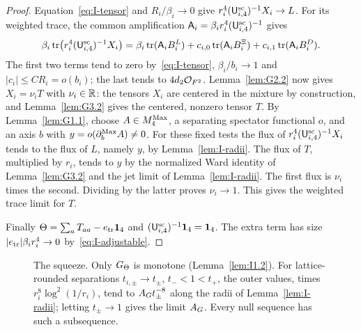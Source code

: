 \begin{proof}
Equation~\eqref{eq:I-tensor} and $R_i/\beta_i\to0$ give $r_i^4(\mathsf{U}_{i,4}^{\mathrm{sc}})^{-1}X_i\to L$. For its weighted trace, the common amplification $\mathsf A_i=\beta_ir_i^4(\mathsf{U}_{i,4}^{\mathrm{sc}})^{-1}$ gives
\begin{equation*}
\beta_i\operatorname{tr}\bigl(r_i^4(\mathsf{U}_{i,4}^{\mathrm{sc}})^{-1}X_i\bigr)
=\beta_i\operatorname{tr}(\mathsf A_iB_i^L)
+c_{i,0}\operatorname{tr}(\mathsf A_iB_i^\Xi)
+c_{i,1}\operatorname{tr}(\mathsf A_iB_i^D).
\end{equation*}
The first two terms tend to zero by~\eqref{eq:I-tensor}, $\beta_i/b_i\to1$ and $|c_i|\le CR_i=o(b_i)$; the last tends to $4d_2\mathcal{O}_{F^2}$. Lemma~\ref{lem:G2.2} now gives $X_i=\nu_iT$ with $\nu_i\in\mathbb{R}$: the tensors $X_i$ are centered in the mixture by construction, and Lemma~\ref{lem:G3.2} gives the centered, nonzero tensor $T$. By Lemma~\ref{lem:G1.1}, choose $A\in M_{4}^{\mathrm{Max}}$, a separating spectator functional $o$, and an axis $b$ with $y=o(\partial_b^{\rm Max}A)\ne0$. For these fixed tests the flux of $r_i^4(\mathsf{U}_{i,4}^{\mathrm{sc}})^{-1}X_i$ tends to the flux of $L$, namely $y$, by Lemma~\ref{lem:I-radii}. The flux of $T$, multiplied by $r_i$, tends to $y$ by the normalized Ward identity of Lemma~\ref{lem:G3.2} and the jet limit of Lemma~\ref{lem:I-radii}. The first flux is $\nu_i$ times the second. Dividing by the latter proves $\nu_i\to1$. This gives the weighted trace limit for $T$.

Finally $\Theta=\sum_aT_{aa}-e_{\rm tr}\mathbf{1}_{4}$ and $(\mathsf{U}_{i,4}^{\mathrm{sc}})^{-1}\mathbf{1}_{4}=\mathbf{1}_{4}$. The extra term has size $|e_{\rm tr}|\beta_ir_i^4\to0$ by~\eqref{eq:I-adjustable}.
\end{proof}

\begin{figure}[t]
\centering
{}
\caption{The squeeze. Only $G_{\Theta}$ is monotone (Lemma~\ref{lem:I1.2}). For lattice-rounded separations $t_{i,\pm}\to t_\pm$, $t_-<1<t_+$, the outer values, times $r_i^8\log^2(1/r_i)$, tend to $A_G t_\pm^{-8}$ along the radii of Lemma~\ref{lem:I-radii}; letting $t_\pm\to1$ gives the limit $A_G$. Every null sequence has such a subsequence.}\label{fig:I-squeeze}
\end{figure}

